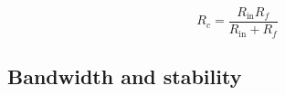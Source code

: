\cite[p.~57]{Jung05}
\cite[p.~25]{Graeme96}

\begin{equation}
	R_c=\frac{R_\text{in}R_f}{R_\text{in}+R_f}
\end{equation}


\subsection{Bandwidth and stability}

\cite[p.~693]{Hobbs11}
\cite[p.~183]{Kay12}
\cite[Ch.~5]{Carter17}
\cite[Ch.~3]{Graeme96}